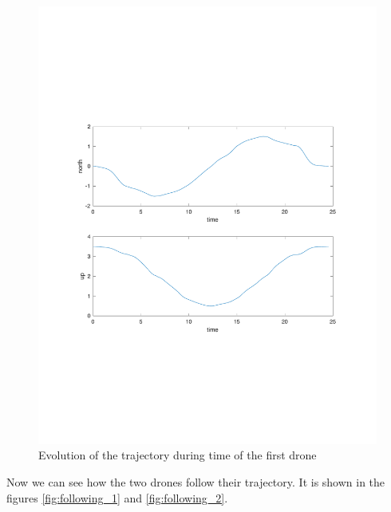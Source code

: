\begin{figure}[h]
\centering
\includegraphics[width=1.0\textwidth]{chapters/chapter-04/figures/trajectory_during_time.pdf}
\caption{Evolution of the trajectory during time of the first drone}
\label{fig:trajectory_during_time}
\end{figure}

Now we can see how the two drones follow their trajectory. It is shown in the figures
\ref{fig:following_1} and \ref{fig:following_2}.

